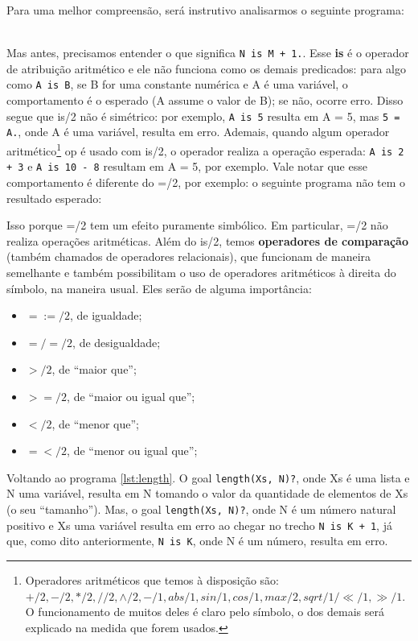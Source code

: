 \documentclass{article}
\theoremstyle{remark}
\begin{document}
Para uma melhor compreensão, será instrutivo analisarmos o seguinte programa:
\\
\\


\label{lst:length}

Mas antes, precisamos entender o que significa {\tt N is M + 1.}. Esse \textbf{is} é o operador de atribuição aritmético e ele não funciona como os demais predicados: para algo como {\tt A is B}, se B for uma constante numérica e A é uma variável, o comportamento é o esperado (A assume o valor de B); se não, ocorre erro. Disso segue que is/2 não é simétrico: por exemplo, {\tt A is 5} resulta em A = 5, mas {\tt 5 = A.}, onde A é uma variável, resulta em erro. Ademais, quando algum
operador aritmético\footnote{Operadores aritméticos que temos à disposição são: $+/2, -/2, */2, //2, \wedge/2, -/1, abs/1, sin/1, cos/1, max/2, sqrt/1/ \ll/1, \gg/1$. O funcionamento de muitos deles é claro pelo símbolo, o dos demais será explicado na medida que forem usados.} op é usado com is/2, o operador realiza a operação esperada: {\tt A is 2 + 3} e {\tt A is 10 - 8} resultam em A = 5, por exemplo. Vale notar que esse comportamento é diferente do =/2, por exemplo: o seguinte programa não tem o resultado esperado:



\noindent Isso porque =/2 tem um efeito puramente simbólico. Em particular, =/2 não realiza operações aritméticas. Além do is/2, temos \textbf{operadores de comparação} (também chamados de operadores relacionais), que funcionam de maneira semelhante e também possibilitam o uso de operadores aritméticos à direita do símbolo, na maneira usual. Eles serão de alguma importância:

\begin{itemize}
  \item $=:=/2$, de igualdade;
  \item $=/=/2$, de desigualdade;
  \item $>/2  $, de ``maior que'';
  \item $>=/2$, de ``maior ou igual que'';
  \item $</2 $, de ``menor que'';
  \item $=</2$, de ``menor ou igual que'';
\end{itemize}

Voltando ao programa \ref{lst:length}. O goal {\tt length(Xs, N)?}, onde Xs é uma lista e N uma variável, resulta em N tomando o valor da quantidade de elementos de Xs (o seu ``tamanho'').  Mas, o goal {\tt length(Xs, N)?}, onde N é um número natural positivo e Xs uma variável resulta em erro ao chegar no trecho {\tt N is K + 1}, já que, como dito anteriormente, {\tt N is K}, onde N é um número, resulta em erro.
\end{document}
